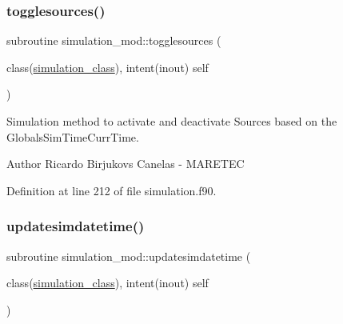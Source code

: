 \subsubsection{\texorpdfstring{togglesources()}{togglesources()}}
{\footnotesize\ttfamily subroutine simulation\+\_\+mod\+::togglesources (\begin{DoxyParamCaption}\item[{class(\mbox{\hyperlink{structsimulation__mod_1_1simulation__class}{simulation\+\_\+class}}), intent(inout)}]{self }\end{DoxyParamCaption})\hspace{0.3cm}{\ttfamily [private]}}



Simulation method to activate and deactivate Sources based on the GlobalsSim\+TimeCurr\+Time. 

\begin{DoxyAuthor}{Author}
Ricardo Birjukovs Canelas -\/ M\+A\+R\+E\+T\+EC 
\end{DoxyAuthor}


Definition at line 212 of file simulation.\+f90.


\mbox{\label{namespacesimulation__mod_a844f0fae91502f3fc79cc1223f55a86c}} 
\subsubsection{\texorpdfstring{updatesimdatetime()}{updatesimdatetime()}}
{\footnotesize\ttfamily subroutine simulation\+\_\+mod\+::updatesimdatetime (\begin{DoxyParamCaption}\item[{class(\mbox{\hyperlink{structsimulation__mod_1_1simulation__class}{simulation\+\_\+class}}), intent(inout)}]{self }\end{DoxyParamCaption})\hspace{0.3cm}{\ttfamily [private]}}



